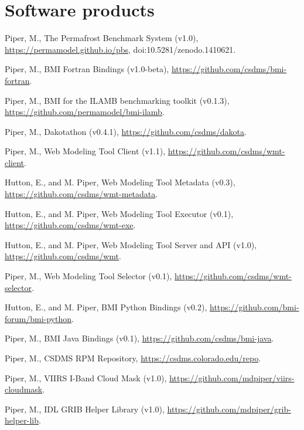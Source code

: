 \section{Software products}
\vspace{0.5em}

\begin{enumerate}[{[}1{]}]

  \item Piper, M., The Permafrost Benchmark System (v1.0),
    \url{https://permamodel.github.io/pbs},
    {doi:10.5281/zenodo.1410621}.

  \item Piper, M., BMI Fortran Bindings (v1.0-beta),
    \url{https://github.com/csdms/bmi-fortran}.

  \item Piper, M., BMI for the ILAMB benchmarking toolkit (v0.1.3),
    \url{https://github.com/permamodel/bmi-ilamb}.

  \item Piper, M., Dakotathon (v0.4.1),
    \url{https://github.com/csdms/dakota}.

  \item Piper, M., Web Modeling Tool Client (v1.1),
    \url{https://github.com/csdms/wmt-client}.

  \item Hutton, E., and M. Piper, Web Modeling Tool Metadata (v0.3),
    \url{https://github.com/csdms/wmt-metadata}.

  \item Hutton, E., and M. Piper, Web Modeling Tool Executor (v0.1),
    \url{https://github.com/csdms/wmt-exe}.

  \item Hutton, E., and M. Piper, Web Modeling Tool Server and API (v1.0),
    \url{https://github.com/csdms/wmt}.

  \item Piper, M., Web Modeling Tool Selector (v0.1),
    \url{https://github.com/csdms/wmt-selector}.

  \item Hutton, E., and M. Piper, BMI Python Bindings (v0.2),
    \url{https://github.com/bmi-forum/bmi-python}.

  \item Piper, M., BMI Java Bindings (v0.1),
    \url{https://github.com/csdms/bmi-java}.

  \item Piper, M., CSDMS RPM Repository,
    \url{https://csdms.colorado.edu/repo}.

  \item Piper, M., VIIRS I-Band Cloud Mask (v1.0),
    \url{https://github.com/mdpiper/viirs-cloudmask}.

  \item Piper, M., IDL GRIB Helper Library (v1.0),
    \url{https://github.com/mdpiper/grib-helper-lib}.

\end{enumerate}

